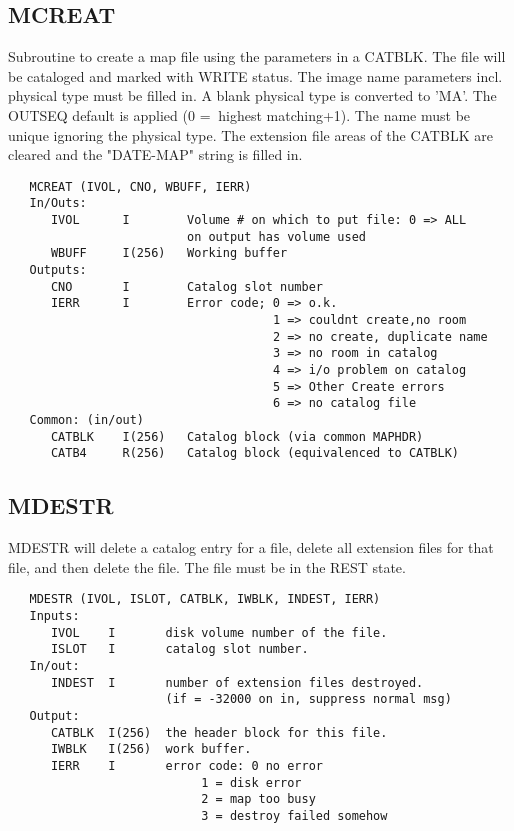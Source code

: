 \subsection{MCREAT}
Subroutine to create a map file using the parameters in a CATBLK.
The file will be cataloged and marked with WRITE status.  The image
name parameters incl. physical type must be filled in.  A blank
physical type is converted to 'MA'.  The OUTSEQ default is applied
(0 =$\>$ highest matching+1).  The name must be unique ignoring the
physical type.  The extension file areas of the CATBLK are cleared
and the "DATE-MAP" string is filled in.
\begin{verbatim}
   MCREAT (IVOL, CNO, WBUFF, IERR)
   In/Outs:
      IVOL      I        Volume # on which to put file: 0 => ALL
                         on output has volume used
      WBUFF     I(256)   Working buffer
   Outputs:
      CNO       I        Catalog slot number
      IERR      I        Error code; 0 => o.k.
                                     1 => couldnt create,no room
                                     2 => no create, duplicate name
                                     3 => no room in catalog
                                     4 => i/o problem on catalog
                                     5 => Other Create errors
                                     6 => no catalog file
   Common: (in/out)
      CATBLK    I(256)   Catalog block (via common MAPHDR)
      CATB4     R(256)   Catalog block (equivalenced to CATBLK)
\end{verbatim}

\subsection{MDESTR}
MDESTR will delete a catalog entry for a file, delete all extension
files for that file, and then delete the file.  The file must be in
the REST state.
\begin{verbatim}
   MDESTR (IVOL, ISLOT, CATBLK, IWBLK, INDEST, IERR)
   Inputs:
      IVOL    I       disk volume number of the file.
      ISLOT   I       catalog slot number.
   In/out:
      INDEST  I       number of extension files destroyed.
                      (if = -32000 on in, suppress normal msg)
   Output:
      CATBLK  I(256)  the header block for this file.
      IWBLK   I(256)  work buffer.
      IERR    I       error code: 0 no error
                           1 = disk error
                           2 = map too busy
                           3 = destroy failed somehow
\end{verbatim}

